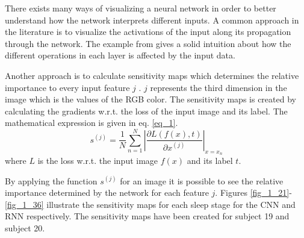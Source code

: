 There exists many ways of visualizing a neural network in order to better understand how the network interprets different inputs.  
A common approach in the literature is to visualize the activations of the input along its propagation through the network. 
The example from \cite{stand_cnn} gives a solid intuition about how the different operations in each layer is affected by the input data.

Another approach is to calculate sensitivity maps which determines the relative importance to every input feature $j$ \cite{main_ar}. $j$ represents the third dimension in the image which is the values of the RGB color.
The sensitivity maps is created by calculating the gradients w.r.t. the loss of the input image and its label. The mathematical expression is given in eq. \ref{eq_1}.
\begin{equation}
s^{\left(j\right)} = \frac { 1 }{ N  } \sum _{ n=1 }^{ N } \left| \frac { \partial L\left( f\left( x \right) ,t \right)  }{ \partial x^{ \left( j \right)  } }  \right| _{x=x_n}
\label{eq_1}
\end{equation}
where $L$ is the loss w.r.t. the input image $f\left(x\right)$ and its label $t$. 

By applying the function $s^{\left(j\right)}$ for an image it is possible to see the relative importance determined by the network for each feature $j$. 
Figures \ref{fig_1_21}-\ref{fig_1_36} illustrate the sensitivity maps for each sleep stage for the CNN and RNN respectively. The sensitivity maps have been created for subject 19 and subject 20.

%
%
